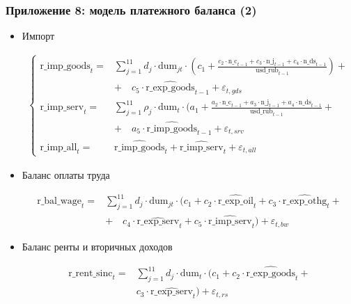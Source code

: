 \documentclass[9pt]{beamer}
\newcommand{\lsum}{\sum\limits}
\begin{document}
\begin{frame}
	\frametitle{Приложение 8: модель платежного баланса (2)}
	\footnotesize
	\begin{itemize}
		
		\item Импорт
		
		\begin{align*}
		\begin{cases}        
		\text{r\_imp\_goods}_t =& \lsum_{j = 1}^{11} d_j \cdot \text{dum}_{jt} \cdot (c_1 +
		\frac{c_2\cdot\text{n\_c}_{t-1} +
			c_3\cdot\text{n\_j}_{t-1} +
			c_4\cdot\text{n\_ds}_{t-1}}{\text{usd\_rub}_{t-1}}) + \\  
		& + \quad c_5 \cdot \widehat{\text{r\_exp\_goods}}_{t-1} + \varepsilon_{t, gds} \\
		\text{r\_imp\_serv}_t =& \lsum_{j = 1}^{11} \rho_j \cdot \text{dum}_t \cdot (a_1 +
		\frac{a_2 \cdot \text{n\_c}_{t-1} +
			a_3 \cdot \text{n\_j}_{t-1} +
			a_4  \cdot \text{n\_ds}_{t-1}}{\text{usd\_rub}_{t-1}} + \\  
		&+ \quad a_5 \cdot \widehat{\text{r\_imp\_goods}}_{t-1} + \varepsilon_{t, srv} \\
		\text{r\_imp\_all}_t =& \widehat{\text{r\_imp\_goods}}_t + \widehat{\text{r\_imp\_serv}}_t + \varepsilon_{t, all}
		\end{cases}
		\end{align*}
		
		\item Баланс оплаты труда
		
		
		\begin{align*}
		\text{r\_bal}\text{\_wage}_t =& \lsum_{j = 1}^{11} d_j \cdot \text{dum}_{jt} \cdot (c_1 + 
		c_2 \cdot \widehat{ \text{r\_exp\_oil}}_t + c_3 \cdot \widehat{ \text{r\_exp\_othg}}_t + \\
		& + \quad c_4 \cdot \widehat{ \text{r\_exp\_serv}}_t + c_5 \cdot \widehat{ \text{r\_imp\_serv}}_t) + \varepsilon_{t, bw} 
		\end{align*}
		
		\item Баланс ренты и вторичных доходов
		
		\begin{align*}
		\text{r\_rent\_sinc}_t = & \lsum_{j = 1}^{11} d_j \cdot \text{dum}_t \cdot (c_1 + c_2 \cdot \widehat{ \text{r\_exp\_goods}}_t + \\
		& c_3 \cdot \widehat{ \text{r\_exp\_serv}}_t) + \varepsilon_{t, rs} 
		\end{align*} 
		

\end{itemize}
\end{frame}
\end{document}
